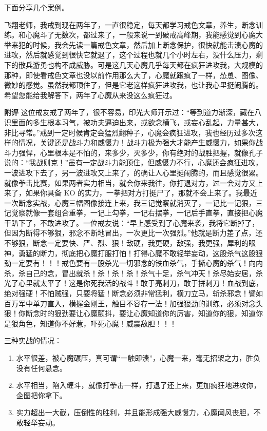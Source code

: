 下面分享几个案例。

\begin{case}
    飞翔老师，我戒到现在两年了，一直很稳定，每天都学习戒色文章，养生，断念训练。和心魔斗了无数次，都过来了，一般来说一到破戒高峰期，我能感觉到心魔大举来犯的时候，我会先读一篇戒色文章，然后加上断念保护，很快就能击溃心魔的进攻，然后就感觉到很快它就退了，这个过程也就几个小时左右，没什么压力，剩下的散兵游勇也构不成威胁。可是这几天心魔几乎每天都在疯狂进攻我，大规模的那种，即使看戒色文章也没以前作用那么大了，心魔就跟疯了一样，怂恿、图像、微妙的感觉。虽然我都顶住了，但是它老这样疯狂进攻我，也让我心里挺闹腾的。希望您能给我解答下，两年了心魔从来没这么疯狂过。

    \textbf{附评} 这位戒友戒了两年了，很不容易，印光大师开示过：“等到道力渐深，藏在八识里面的多生根本习气，被功夫逼迫出来，或欲念横飞，或妄心乱起，力量甚大，非比寻常。”戒到一定时候肯定会猛烈翻种子，心魔会疯狂进攻，我也经历过多次这样的情况，关键还是战斗力和威慑力！战斗力极为强大才能产生威慑力，如果你战斗力强悍，心里根本是不怕的，来多少，灭多少，你有绝对的战胜把握，就像孔子说的：“我战则克！”虽有一定战斗力能顶住，但威慑力不行，心魔还会疯狂进攻，一波进攻下去了，另一波进攻又上来了，的确让人心里挺闹腾的，而且感觉很累。就像拳击比赛，如果两者实力相当，就会你来我往，你打退对方，过一会对方又上来了，如果你具备 KO 的实力，一拳把对方打挺尸了，那就不会上来了。我最近一次断念实战，心魔三幅图像接连上来，我三记觉察就消灭了，一记比一记狠，三记觉察就像一套组合重拳，一记上勾拳，一记右摆拳，一记后手直拳，直接把心魔干趴下了，不敢进攻了。一位戒友说：“早上感受到了心魔来袭，我将它断掉了，但因为断得不够狠，邪念不断地冒出，一次更比一次强烈。”他就是断力差了点，还不够狠，断念一定要快、严、烈、狠！敌硬，我更硬，敌强，我更强，犀利的眼神，勇猛的断力，彻底把心魔打服打怕！打得心魔不敢轻举妄动，这股杀气这股狠劲一定要有！！！戒色要有一股杀光一切邪念的铁血杀气，手撕心魔的杀气！向内杀，杀自己的念，冒出就杀！杀！杀！杀！杀气十足，杀气冲天！杀尽始安居，杀光了心里就太平了！这是你死我活的战斗！敢于亮刺刀，敢于拼刺刀！血战到底，绝对强硬！不怕贼强，只要将猛！断念必须非常猛利，横刀立马，斩杀邪念！譬如百万军中单刀直入，横握金刚王，触目不容存一法！加强狠劲的训练，必须对念头狠！你断念时的狠劲要让心魔颤抖，要让心魔知道你的厉害，知道你的狠，知道你是狠角色，知道你不好惹，吓死心魔！威震敌胆！！！

    三种实战的情况：

    \begin{enumerate}
        \item 水平很差，被心魔碾压，真可谓“一触即溃”，心魔一来，毫无招架之力，胜负没有任何悬念。
        \item 水平相当，陷入缠斗，就像打拳击一样，打退了还上来，更加疯狂地进攻你，企图把你拿下。
        \item 实力超出一大截，压倒性的胜利，并且能形成强大威慑力，心魔闻风丧胆，不敢轻举妄动。
    \end{enumerate}


\end{case}
